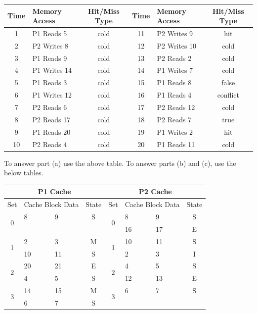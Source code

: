 \documentclass[12pt, a4paper]{article}
\begin{document}
\begin{center}
\begin{tabular}{|c|l|c||c|l|c|}
\hline
Time & Memory Access & Hit/Miss Type & Time & Memory Access & Hit/Miss Type \\
\hline
1 & P1 Reads 5 & cold & 11 & P2 Writes 9 & hit \\
\hline
2 & P2 Writes 8 & cold & 12 & P2 Writes 10 & cold \\
\hline
3 & P1 Reads 9 & cold & 13 & P2 Reads 2 & cold \\
\hline
4 & P1 Writes 14 & cold & 14 & P1 Writes 7 & cold \\
\hline
5 & P1 Reads 3 & cold & 15 & P1 Reads 8 & false \\
\hline
6 & P1 Writes 12 & cold & 16 & P1 Reads 4 & conflict \\
\hline
7 & P2 Reads 6 & cold & 17 & P2 Reads 12 & cold \\
\hline
8 & P2 Reads 17 & cold & 18 & P2 Reads 7 & true \\
\hline
9 & P1 Reads 20 & cold & 19 & P1 Writes 2 & hit \\
\hline
10 & P2 Reads 4 & cold & 20 & P1 Reads 11 & cold \\
\hline
\end{tabular}
\end{center}

\vspace{2em}

To answer part (a) use the above table. To answer parts (b) and (c), use the below tables.

\begin{center}
\begin{tabularx}{\textwidth}{|c|X|X|c||c|X|X|c|}
\hline
\multicolumn{4}{|c||}{P1 Cache} & \multicolumn{4}{c|}{P2 Cache} \\
\hline
Set & \multicolumn{2}{c|}{Cache Block Data} & State & Set & \multicolumn{2}{c|}{Cache Block Data}& State \\
\hline
\multirow{2}{*}{0} & 8 & 9 & S & \multirow{2}{*}{0} & 8 & 9 & S\\
\cline{2-4} \cline{6-8}
& & & & & 16& 17& E\\
\hline
\multirow{2}{*}{1} & 2 & 3 & M & \multirow{2}{*}{1} & 10 & 11 & S\\
\cline{2-4} \cline{6-8}
& 10& 11& S& & 2& 3& I\\
\hline
\multirow{2}{*}{2} & 20& 21& E& \multirow{2}{*}{2} & 4& 5& S\\
\cline{2-4} \cline{6-8}
& 4& 5& S& & 12& 13& E\\
\hline
\multirow{2}{*}{3} & 14& 15& M& \multirow{2}{*}{3} & 6& 7& S\\
\cline{2-4} \cline{6-8}
& 6& 7& S& & & & \\
\hline
\end{tabularx}
\end{center}
\end{document}
